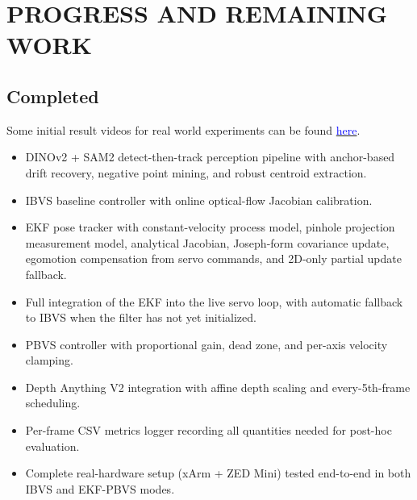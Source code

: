 \documentclass[letterpaper, 10 pt, conference]{ieeeconf}  %
\begin{document}
\section{PROGRESS AND REMAINING WORK}

\subsection{Completed}

Some initial result videos for real world experiments can be found \href{https://drive.google.com/file/d/1beLwBDPymnEFNrw9vw_qGlmb-9raleHW/view?usp=sharing}{\textcolor{blue}{here}}.
\begin{itemize}
\item DINOv2 + SAM2 detect-then-track perception pipeline with anchor-based drift recovery, negative point mining, and robust centroid extraction.
\item IBVS baseline controller with online optical-flow Jacobian calibration.
\item EKF pose tracker with constant-velocity process model, pinhole projection measurement model, analytical Jacobian, Joseph-form covariance update, egomotion compensation from servo commands, and 2D-only partial update fallback.
\item Full integration of the EKF into the live servo loop, with automatic fallback to IBVS when the filter has not yet initialized.
\item PBVS controller with proportional gain, dead zone, and per-axis velocity clamping.
\item Depth Anything V2 integration with affine depth scaling and every-5th-frame scheduling.
\item Per-frame CSV metrics logger recording all quantities needed for post-hoc evaluation.
\item Complete real-hardware setup (xArm + ZED Mini) tested end-to-end in both IBVS and EKF-PBVS modes.
\end{itemize}
\end{document}
